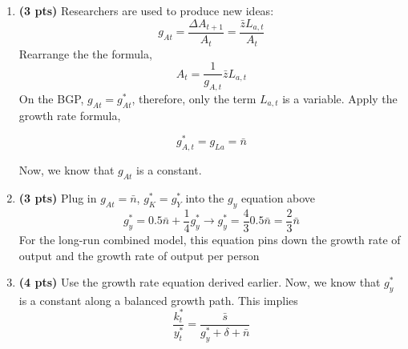 \documentclass[addpoints,12pt,answers]{exam}
\begin{document}
\begin{enumerate}[label=\textbf{\arabic*.}, itemsep=15pt]
\begin{enumerate}[label=(\alph*)]
			Plug in ($I_t = s Y_t$)
			\[K_{t+1}- K_t = \Delta K_{t+1}=  sY_t -\delta K_t\]
			Divide both side by $K_t$,
			\[\frac{\Delta K_{t+1}}{K_t} = g_K  = s\frac{Y_t }{K_t}-\delta = s\frac{Y_t/L_t }{K_t/L_t}-\delta = s\frac{y_t }{k_t}-\delta\]
			Now, recall that $k_t = \frac{K_t}{L_t}$ and apply the growth rate approximate formula:
			\[g_k = g_K - g_L\]
			
			Next, plug in the $g_K$ above and the fact that $g_L = \bar{n}$
			\[g_k= \frac{\Delta k_{t+1}}{k_t} = s\frac{y_t }{k_t}-\delta - \bar{n}\]
			
			
			On the BGP, \(g_{k,t}\) is a constant, therefore, the right-hand side must also be constant. Given that \(\bar{s}\) $\bar{n}$ and \(\delta\) are constants, \(\frac{y_t}{k_t}\) must be constant. This condition is met only if \(y_t\) and \(k_t\) are growing at the same rate. If \(y_t\) were growing at a faster rate, the ratio \(\frac{y_t}{k_t}\) would increase each period. Therefore, it follows that \(g_K^* = g_Y^*\).
			
			\vspace{1cm}
			\item \textbf{(3 pts)} 	
			Researchers are used to produce new ideas:
			\[g_{At} = \frac{\Delta A_{t+1}}{A_t} =\frac{\bar{z}L_{a,t}}{A_t} \]
			Rearrange the the formula,
			\[A_t = \frac{1}{g_{A,t}} \bar{z} L_{a,t}\]
			On  the BGP, $g_{At} = g^*_{At}$, therefore, only the term $L_{a,t}$ is a variable. Apply the growth rate formula,
			
			\[g^*_{A,t} = g_{La} = \bar{n}\]
			
			Now, we know that $g_{At}$ is a constant.
			
			
			\item \textbf{(3 pts)}	
			Plug in $g_{At}=\bar{n}$, $g_K^* = g_Y^*$ into the $g_y$ equation above
			\[g_{y}^* = 0.5\bar{n} + \frac{1}{4} g_{y}^* \to g_{y}^* = \frac{4}{3} 0.5\bar{n} = \frac{2}{3} \bar{n}\]
			For the long-run combined model, this equation pins down	the growth rate of output and 	the growth rate of output per person
			
			
			
			\vspace{1cm}
			
			\clearpage
			\item \textbf{(4 pts)} 
			Use the growth rate equation derived earlier. 
			Now, we know that $g_y^*$ is a constant along a balanced growth path. This implies
			\[\frac{k^*_t}{y^*_t} = \frac{\bar{s}}{g_y^* + \delta + \bar{n}}\]
			

\end{enumerate}
\end{enumerate}
\end{document}
